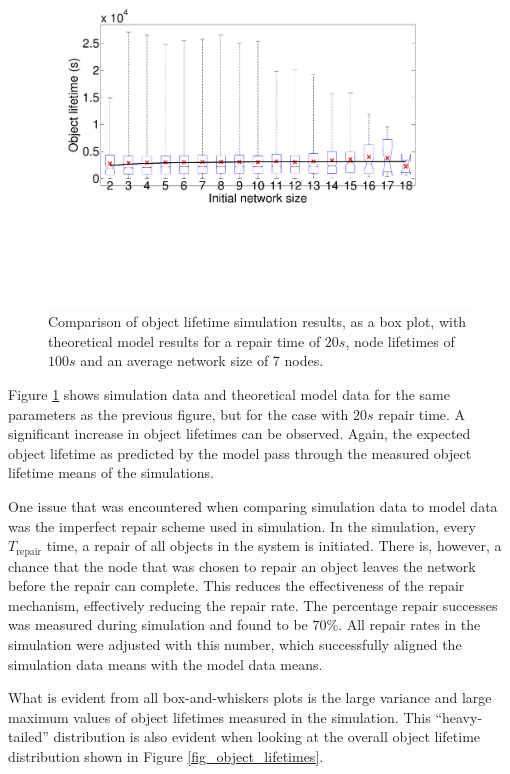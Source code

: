 \documentclass[10pt,a4paper,conference]{IEEEtran}
\begin{document}
\begin{figure}[htbp]
 \centering
 \includegraphics[clip=true, viewport=0.5cm 7.0cm 26.0cm 21cm, width=\columnwidth]{lifetime_simulation_model_20_100}
 \caption{Comparison of object lifetime simulation results, as a box plot, with theoretical model results for a repair time of $20 s$, node lifetimes of $100 s$ and an average network size of 7 nodes.}
 \label{fig_lifetime_simulation_model_20_100}
\end{figure}
%
Figure \ref{fig_lifetime_simulation_model_20_100} shows simulation data and theoretical model data for the same parameters as the previous figure, but for the case with $20 s$ repair time. A significant increase in object lifetimes can be observed. Again, the expected object lifetime as predicted by the model pass through the measured object lifetime means of the simulations.

One issue that was encountered when comparing simulation data to model data was the imperfect repair scheme used in simulation. In the simulation, every $T_{\textrm{repair}}$ time, a repair of all objects in the system is initiated. There is, however, a chance that the node that was chosen to repair an object leaves the network before the repair can complete. This reduces the effectiveness of the repair mechanism, effectively reducing the repair rate. The percentage repair successes was measured during simulation and found to be $70 \%$. All repair rates in the simulation were adjusted with this number, which successfully aligned the simulation data means with the model data means.

What is evident from all box-and-whiskers plots is the large variance and large maximum values of object lifetimes measured in the simulation. This ``heavy-tailed'' distribution is also evident when looking at the overall object lifetime distribution shown in Figure \ref{fig_object_lifetimes}. 
\end{document}
